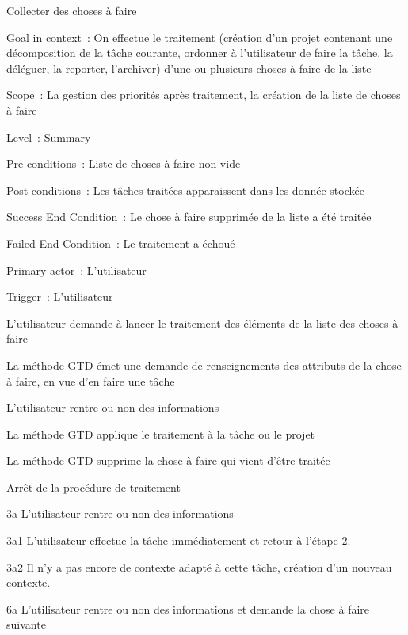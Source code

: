 \begin{usecase}{Collecter des choses à faire}
\begin{information}
\item[Goal in context~:] On effectue le traitement (création d'un projet contenant une décomposition de la tâche courante, ordonner à l'utilisateur de faire la tâche, la déléguer, la reporter, l'archiver) d'une ou plusieurs choses à faire de la liste
\item[Scope~:] La gestion des priorités après traitement, la création de la liste de choses à faire
\item[Level~:] Summary
\item[Pre-conditions~:] Liste de choses à faire non-vide
\item[Post-conditions~:] Les tâches traitées apparaissent dans les donnée stockée
\item[Success End Condition~:] Le chose à faire supprimée de la liste a été traitée
\item[Failed End Condition~:] Le traitement a échoué
\item[Primary actor~:] L'utilisateur
\item[Trigger~:] L'utilisateur
\\
\end{information}
\begin{scenario}
\item L'utilisateur demande à lancer le traitement des éléments de la liste des choses à faire
\item La méthode GTD émet une demande de renseignements des attributs de la chose à faire, en vue d'en faire une tâche
\item L'utilisateur rentre ou non des informations
\item La méthode GTD applique le traitement à la tâche ou le projet
\item La méthode GTD supprime la chose à faire qui vient d'être traitée
\item Arrêt de la procédure de traitement
\\
\end{scenario}
\begin{variation}
\item[3a] L'utilisateur rentre ou non des informations
\item[3a1] L'utilisateur effectue la tâche immédiatement et retour à l'étape 2.
\item[3a2] Il n'y a pas encore de contexte adapté à cette tâche, création d'un nouveau contexte.
\item[6a] L'utilisateur rentre ou non des informations et demande la chose à faire suivante

\end{variation}
\end{usecase}
